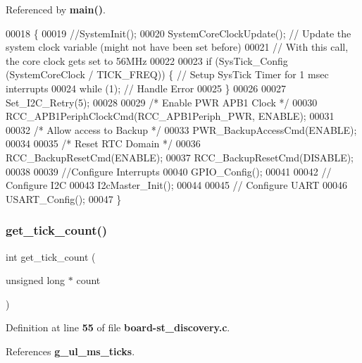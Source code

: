 Referenced by \textbf{ main()}.


\begin{DoxyCode}
00018 \{
00019     \textcolor{comment}{//SystemInit();}
00020     SystemCoreClockUpdate();                               \textcolor{comment}{// Update the system clock variable (might not
       have been set before)}
00021                                                            \textcolor{comment}{// With this call, the core clock gets set to
       56MHz}
00022     
00023     \textcolor{keywordflow}{if} (SysTick\_Config (SystemCoreClock / TICK_FREQ)) \{     \textcolor{comment}{// Setup SysTick Timer for 1 msec interrupts}
00024         \textcolor{keywordflow}{while} (1);                                          \textcolor{comment}{// Handle Error}
00025     \}   
00026     
00027     Set_I2C_Retry(5);
00028   
00029     \textcolor{comment}{/* Enable PWR APB1 Clock */}
00030     RCC_APB1PeriphClockCmd(RCC_APB1Periph_PWR, ENABLE);
00031 
00032     \textcolor{comment}{/* Allow access to Backup */}
00033     PWR_BackupAccessCmd(ENABLE);
00034 
00035     \textcolor{comment}{/* Reset RTC Domain */}
00036     RCC_BackupResetCmd(ENABLE);
00037     RCC_BackupResetCmd(DISABLE);
00038  
00039     \textcolor{comment}{//Configure Interrupts}
00040     GPIO_Config();  
00041 
00042     \textcolor{comment}{// Configure I2C}
00043     I2cMaster_Init(); 
00044 
00045     \textcolor{comment}{// Configure UART}
00046     USART_Config(); 
00047 \}
\end{DoxyCode}
\mbox{\label{board-st__discovery_8h_ae640b1a6fa58dce2fd3858ed0df803c0}} 
\subsubsection{get\+\_\+tick\+\_\+count()}
{\footnotesize\ttfamily int get\+\_\+tick\+\_\+count (\begin{DoxyParamCaption}\item[{unsigned long $\ast$}]{count }\end{DoxyParamCaption})}



Definition at line \textbf{ 55} of file \textbf{ board-\/st\+\_\+discovery.\+c}.



References \textbf{ g\+\_\+ul\+\_\+ms\+\_\+ticks}.



